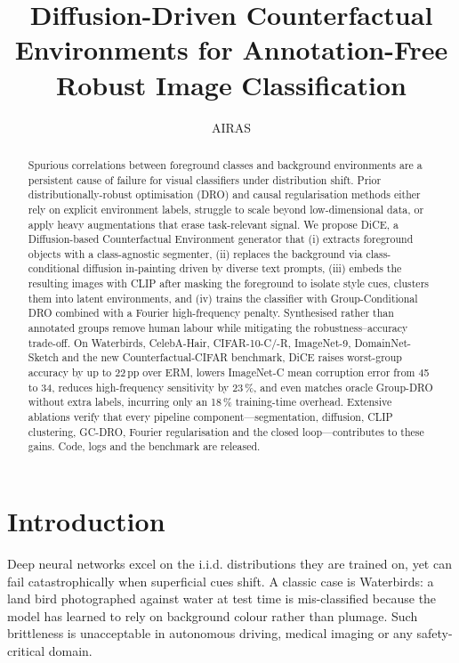 \documentclass{article}
\title{Diffusion-Driven Counterfactual Environments for Annotation-Free Robust Image Classification}
\author{AIRAS}
\begin{document}
\maketitle

\begin{abstract}
Spurious correlations between foreground classes and background environments are a persistent cause of failure for visual classifiers under distribution shift. Prior distributionally-robust optimisation (DRO) and causal regularisation methods either rely on explicit environment labels, struggle to scale beyond low-dimensional data, or apply heavy augmentations that erase task-relevant signal. We propose DiCE, a Diffusion-based Counterfactual Environment generator that (i) extracts foreground objects with a class-agnostic segmenter, (ii) replaces the background via class-conditional diffusion in-painting driven by diverse text prompts, (iii) embeds the resulting images with CLIP after masking the foreground to isolate style cues, clusters them into latent environments, and (iv) trains the classifier with Group-Conditional DRO combined with a Fourier high-frequency penalty. Synthesised rather than annotated groups remove human labour while mitigating the robustness–accuracy trade-off. On Waterbirds, CelebA-Hair, CIFAR-10-C/-R, ImageNet-9, DomainNet-Sketch and the new Counterfactual-CIFAR benchmark, DiCE raises worst-group accuracy by up to 22\,pp over ERM, lowers ImageNet-C mean corruption error from 45 to 34, reduces high-frequency sensitivity by 23\,\%, and even matches oracle Group-DRO without extra labels, incurring only an 18\,\% training-time overhead. Extensive ablations verify that every pipeline component—segmentation, diffusion, CLIP clustering, GC-DRO, Fourier regularisation and the closed loop—contributes to these gains. Code, logs and the benchmark are released.
\end{abstract}

\section{Introduction}
Deep neural networks excel on the i.i.d. distributions they are trained on, yet can fail catastrophically when superficial cues shift. A classic case is Waterbirds: a land bird photographed against water at test time is mis-classified because the model has learned to rely on background colour rather than plumage. Such brittleness is unacceptable in autonomous driving, medical imaging or any safety-critical domain.
\end{document}
